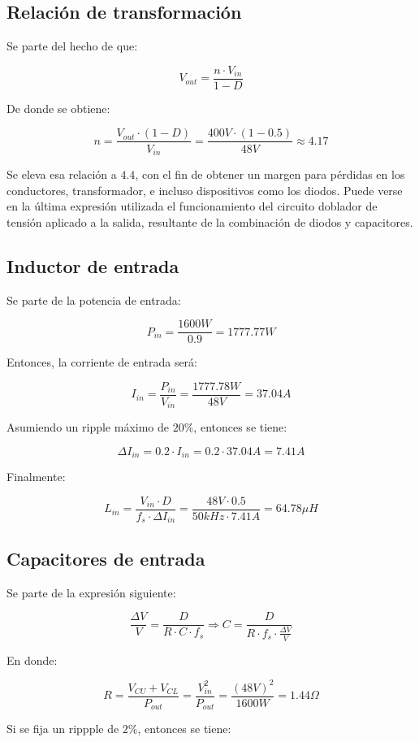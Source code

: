 \subsection{Relación de transformación}

Se parte del hecho de que:

$$
V_{out}=\frac{n\cdot V_{in}}{1-D}
$$

De donde se obtiene:

$$
n=\frac{V_{out}\cdot (1-D)}{V_{in}}=\frac{400V\cdot (1-0.5)}{48V}\approx 4.17
$$

Se eleva esa relación a $4.4$, con el fin de obtener un margen para pérdidas en los conductores, transformador, e incluso dispositivos como los diodos. Puede verse en la última expresión utilizada el funcionamiento del circuito doblador de tensión aplicado a la salida, resultante de la combinación de diodos y capacitores.

\subsection{Inductor de entrada}

Se parte de la potencia de entrada:

$$
P_{in}=\frac{1600W}{0.9}=1777.77W
$$

Entonces, la corriente de entrada será:

$$
I_{in} = \frac{P_{in}}{V_{in}}=\frac{1777.78W}{48V}=37.04A
$$

Asumiendo un ripple máximo de $20\%$, entonces se tiene:

$$
\Delta I_{in} = 0.2\cdot I_{in}=0.2\cdot 37.04 A = 7.41A
$$

Finalmente:

$$
L_{in}=\frac{V_{in}\cdot D}{f_s \cdot \Delta I_{in}}=\frac{48V\cdot 0.5}{50kHz\cdot 7.41A}=64.78 \mu H
$$

\subsection{Capacitores de entrada}

Se parte de la expresión siguiente:

$$
\frac{\Delta V}{V}=\frac{D}{R \cdot C \cdot f_s}\Rightarrow C=\frac{D}{R \cdot f_s \cdot \frac{\Delta V}{V}}
$$

En donde:

$$
R=\frac{V_{CU}+V_{CL}}{P_{out}}=\frac{V_{in}^2}{P_{out}}=\frac{(48V)^2}{1600W}=1.44\Omega
$$

Si se fija un rippple de $2\%$, entonces se tiene:


